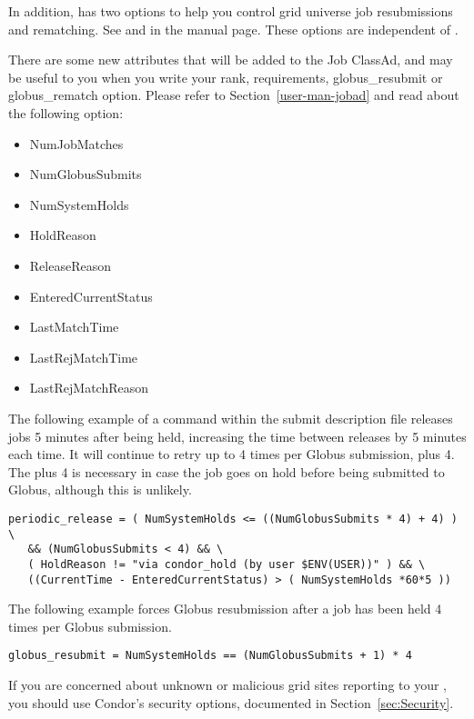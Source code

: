 In addition,  has two options to help you control
grid universe job resubmissions and rematching.  See  and
 in the  manual page.
These options are independent of .

There are some new attributes that will be added to the Job ClassAd,
and may be useful to you when you write your rank, requirements,
globus\_resubmit or globus\_rematch option. Please refer to
Section~\ref{user-man-jobad} and read about the following option:

\begin{itemize}
\item NumJobMatches
\item NumGlobusSubmits
\item NumSystemHolds
\item HoldReason
\item ReleaseReason
\item EnteredCurrentStatus
\item LastMatchTime
\item LastRejMatchTime
\item LastRejMatchReason
\end{itemize}

The following example of a command within the submit description file
releases jobs 5 minutes after being held,
increasing the time between releases by 5 minutes each time.
It will continue to retry up to 4 times per Globus
submission, plus 4.
The plus 4 is necessary in case
the job goes on hold before being submitted to Globus, although
this is unlikely.

\footnotesize
\begin{verbatim}
periodic_release = ( NumSystemHolds <= ((NumGlobusSubmits * 4) + 4) ) \
   && (NumGlobusSubmits < 4) && \
   ( HoldReason != "via condor_hold (by user $ENV(USER))" ) && \
   ((CurrentTime - EnteredCurrentStatus) > ( NumSystemHolds *60*5 ))
\end{verbatim}
\normalsize

The following example forces Globus resubmission after a job has
been held 4 times per Globus submission.

\footnotesize
\begin{verbatim}
globus_resubmit = NumSystemHolds == (NumGlobusSubmits + 1) * 4
\end{verbatim}
\normalsize

If you are concerned about unknown or malicious grid sites reporting
to your , you should use Condor's security options,
documented in Section~\ref{sec:Security}.
